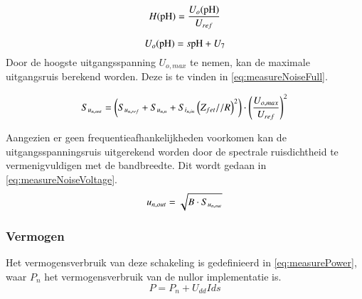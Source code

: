 \begin{equation}
    H(\mathrm{pH}) = \frac{U_o(\mathrm{pH})}{U_{ref}}
    \label{eq:measureTransfer}
\end{equation}

\begin{equation}\label{eq:measureOutVoltage}
    U_o(\ph) = s\ph + U_7
    \tagaddtext{[\si{\volt}]}
\end{equation}
Door de hoogste uitgangsspanning $U_{o,max}$ te nemen, kan de maximale uitgangsruis berekend worden. Deze is te vinden in \autoref{eq:measureNoiseFull}.

\begin{equation}\label{eq:measureNoiseFull}
    S_{u_{{n,out}}} = \left(S_{u_{{n,ref}}} + S_{u_{{n,n}}} + S_{i_{{n,in}}}\left(Z_{fet} // R\right)^2\right) \cdot \left(\frac{U_{o,max}}{U_{ref}}\right)^2
    \tagaddtext{[\si{\volt\squared\per\hertz}]}
\end{equation}

Aangezien er geen frequentieafhankelijkheden voorkomen kan de uitgangsspanningsruis uitgerekend worden door de spectrale ruisdichtheid te vermenigvuldigen met de bandbreedte. Dit wordt gedaan in \autoref{eq:measureNoiseVoltage}.
\begin{equation}\label{eq:measureNoiseVoltage}
    u_{n,out} = \sqrt{B \cdot S_{u_{{n,out}}}}
    \tagaddtext{[\si{\volt}]}
\end{equation}

\subsubsection{Vermogen}
Het vermogensverbruik van deze schakeling is gedefinieerd in \autoref{eq:measurePower}, waar $P_n$ het vermogensverbruik van de nullor implementatie is. 
\begin{equation}\label{eq:measurePower}
    P = P_n + U_{dd}I{ds}
\end{equation}

